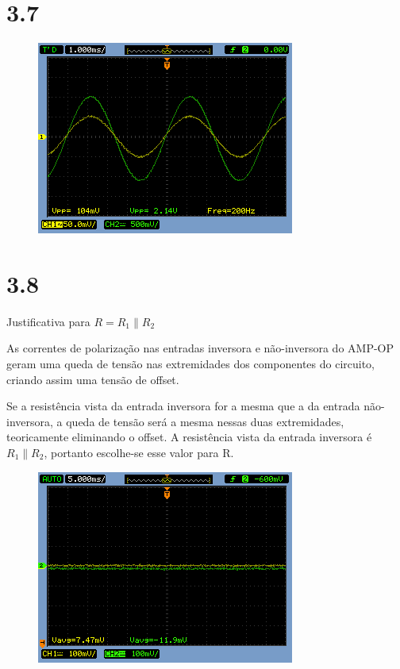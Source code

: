 \documentclass[brazil]{article}
\begin{document}
\section*{3.7}

\begin{figure}[H]
\begin{centering}
\includegraphics[scale=0.5]{figuras/37}
\par\end{centering}
\caption{}
\end{figure}
%

\section*{3.8}
Justificativa para $R=R_1\parallel R_2$


As correntes de polarização nas entradas inversora e não-inversora do AMP-OP geram uma
queda de tensão nas extremidades dos componentes do circuito, criando assim uma tensão de offset.

Se a resistência vista da entrada inversora for a mesma que a da entrada não-inversora, a queda de tensão será a mesma nessas duas extremidades, teoricamente eliminando o offset. A resistência vista da entrada inversora é  $R_1\parallel R_2$, portanto escolhe-se esse valor para R.

\begin{figure}[H]
\begin{centering}
\includegraphics[scale=0.5]{figuras/382cr}
\par\end{centering}

\caption{}

\end{figure}
\end{document}

